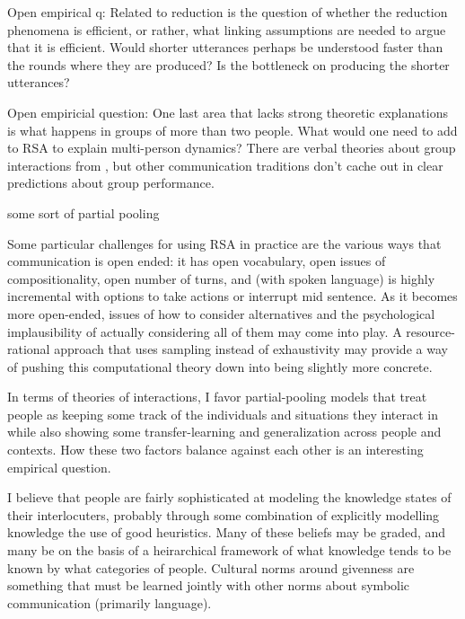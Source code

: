 \documentclass[]{article}
\begin{document}
	Open empirical q: Related to reduction is the question of whether the reduction phenomena is efficient, or rather, what linking assumptions are needed to argue that it is efficient. Would shorter utterances perhaps be understood faster than the rounds where they are produced? Is the bottleneck on producing the shorter utterances? 
	
	Open empiricial question: One last area that lacks strong theoretic explanations is what happens in groups of more than two people. What would one need to add to RSA to explain multi-person dynamics? There are verbal theories about group interactions from \cite{yoon2018}, but other communication traditions don't cache out in clear predictions about group performance. 
	
	some sort of partial pooling 
	
	Some particular challenges for using RSA in practice are the various ways that communication is open ended: it has open vocabulary, open issues of compositionality, open number of turns, and (with spoken language) is highly incremental with options to take actions or interrupt mid sentence. As it becomes more open-ended, issues of how to consider alternatives and the psychological implausibility of actually considering all of them may come into play. A resource-rational approach that uses sampling instead of exhaustivity may provide a way of pushing this computational theory down into being slightly more concrete. 
	
	In terms of theories of interactions, I favor partial-pooling models that treat people as keeping some track of the individuals and situations they interact in while also showing some transfer-learning and generalization across people and contexts. How these two factors balance against each other is an interesting empirical question. 
	
	I believe that people are fairly sophisticated at modeling the knowledge states of their interlocuters, probably through some combination of explicitly modelling knowledge the use of good heuristics. Many of these beliefs may be graded, and many be on the basis of a heirarchical framework of what knowledge tends to be known by what categories of people.  Cultural norms around givenness are something that must be learned jointly with other norms about symbolic communication (primarily language). 
	
\end{document}
